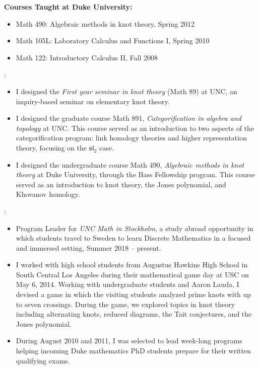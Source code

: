 \documentclass[10pt]{article}
\begin{document}
\smallskip
\noindent\textbf{Courses Taught at Duke University:}
\begin{itemize}
\item Math 490: Algebraic methods in knot theory, Spring 2012
\item Math 105L: Laboratory Calculus and Functions I, Spring 2010
\item Math 122: Introductory Calculus II, Fall 2008
\end{itemize}

\smallskip
{}:
\begin{itemize}
\item I designed the {\it First year seminar in knot theory} (Math 89) at UNC, 
an inquiry-based seminar on elementary knot theory.

\item I designed the graduate course Math 891, {\it Categorification in algebra and topology} at UNC. 
This course served as an introduction to two aspects of the categorification program: link homology theories and higher representation theory, 
focusing on the $\mathfrak{sl}_2$ case.

\item I designed the undergraduate course Math 490, {\it Algebraic methods in knot theory} at Duke University, through the Bass Fellowship
program. This course served as an introduction to knot theory, the Jones polynomial, and Khovanov homology.
\end{itemize}

\smallskip
{}:
\begin{itemize}
\item Program Leader for \emph{UNC Math in Stockholm}, 
a study abroad opportunity in which students travel to Sweden to learn Discrete Mathematics in 
a focused and immersed setting, Summer 2018 -- present. 

\item I worked with high school students from Augustus Hawkins High School in South Central Los Angeles during their mathematical game day at USC on May 6, 2014. 
Working with undergraduate students and Aaron Lauda, I devised a game in which the visiting students analyzed prime knots 
with up to seven crossings. During the game, we explored topics in knot theory including alternating knots, reduced diagrams, the Tait conjectures, and the Jones polynomial.

\item During August 2010 and 2011, 
I was selected to lead week-long programs helping incoming Duke mathematics PhD students prepare for their written qualifying exams.
\end{itemize}
\end{document}
